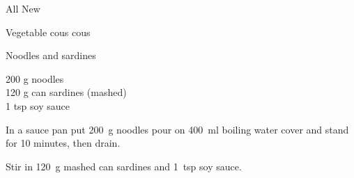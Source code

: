 \begin{menu}{All New}
\begin{recipe}{2}{Vegetable cous cous}
\begin{instructions}
    \end{instructions}
    \end{recipe}%
  
    \begin{recipe}{1}{Noodles and sardines}%
    
		\begin{ingredients}
		200 g noodles  \\
	120 g can sardines (mashed) \\
	1 tsp soy sauce  \\
	
		\end{ingredients}
	
    \begin{instructions}
    \item 
      In a sauce pan
      put
      200~g  noodles
      pour on
      400~ml  boiling water
      cover and stand for 10 minutes, then drain.
    \item 
        Stir in
        120~g mashed can sardines
        and
        1~tsp  soy sauce.
      
    \end{instructions}
    \end{recipe}%
  
    \clearpage
    \end{menu}
	
	